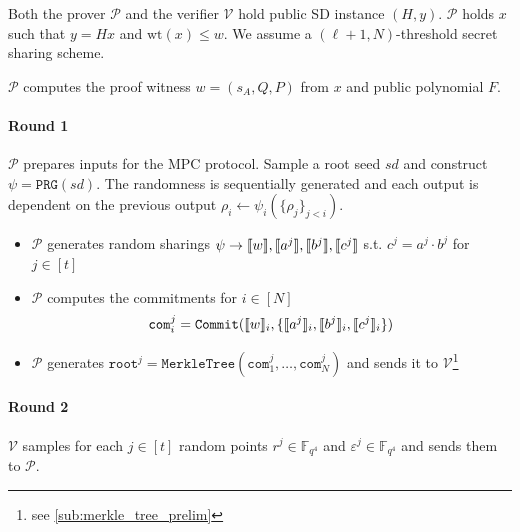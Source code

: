\documentclass[11pt]{report}
\theoremstyle{definition}
\theoremstyle{plain}
\begin{document}
\begin{protocol}\label{def:sdith-zkpok}
  \setlength{\parskip}{5pt}
  \setlength{\parindent}{0pt}
  \titlespacing*{\paragraph}{0pt}{1pt}{1em}
  Both the prover $\mathcal{P}$ and the verifier $\mathcal{V}$ hold public SD instance $(H,y)$. $\mathcal{P}$ holds $x$ such that $y = Hx$ and $\text{wt}(x) \leq w$. We assume a $(\ell + 1, N)$-threshold secret sharing scheme.

  $\mathcal{P}$ computes the proof witness $w = (s_A, Q, P)$ from $x$ and public polynomial $F$.

  \paragraph{Round 1}
  $\mathcal{P}$ prepares inputs for the MPC protocol. Sample a root seed $sd$ and construct $\psi = \texttt{PRG}(sd)$. The randomness is sequentially generated and each output is dependent on the previous output $\rho_i \leftarrow \psi_i(\{\rho_j\}_{j < i})$.

  \begin{itemize}[parsep=0pt, itemsep=0pt, topsep=0pt]
    \item $\mathcal{P}$ generates random sharings $\psi \rightarrow \llbracket w \rrbracket, \llbracket a^j \rrbracket, \llbracket b^j \rrbracket, \llbracket c^j \rrbracket$ s.t. $c^j = a^j \cdot b^j$ for $j \in [t]$
    \item $\mathcal{P}$ computes the commitments for $i \in [N]$
          \begin{align*}
            \texttt{com}^j_i = \texttt{Commit}(\llbracket w \rrbracket_i, \{ \llbracket a^j \rrbracket_i, \llbracket b^j \rrbracket_i, \llbracket c^j \rrbracket_i \})
          \end{align*}
    \item $\mathcal{P}$ generates $\texttt{root}^j = \texttt{MerkleTree}(\texttt{com}^j_1, \ldots, \texttt{com}^j_N)$ and sends it to $\mathcal{V}$\footnote{see \autoref{sub:merkle_tree_prelim}}
  \end{itemize}

  \paragraph{Round 2}
  $\mathcal{V}$ samples for each $j \in [t]$ random points $r^j \in \mathbb{F}_{q^4}$ and $\varepsilon^j \in \mathbb{F}_{q^4}$ and sends them to $\mathcal{P}$.


\end{protocol}
\end{document}
